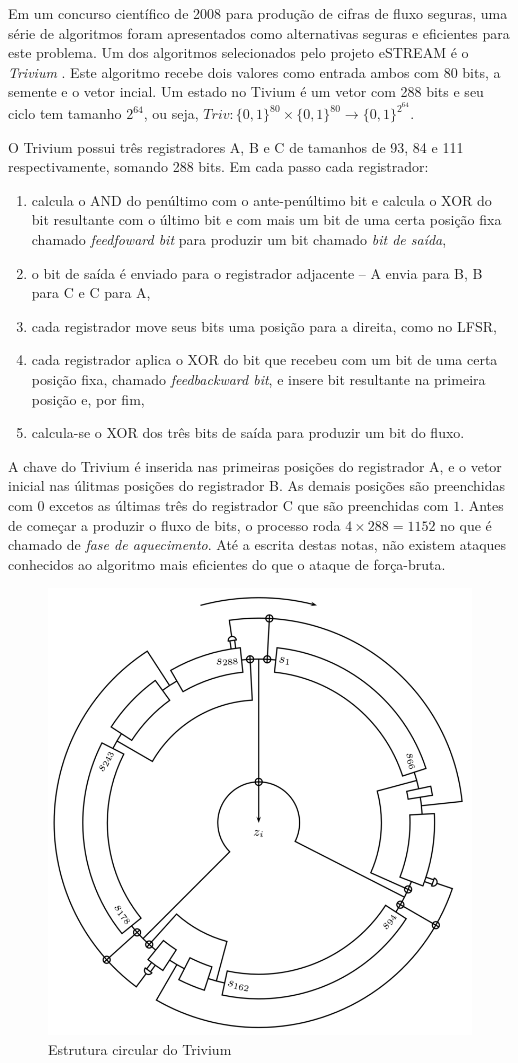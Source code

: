 Em um concurso científico de 2008 para produção de cifras de fluxo seguras, uma série de algoritmos foram apresentados como alternativas seguras e eficientes para este problema.
Um dos algoritmos selecionados pelo projeto eSTREAM é o {\em Trivium} \cite{DeCanniere06}.
Este algoritmo recebe dois valores como entrada ambos com 80 bits, a semente e o vetor incial.
Um estado no Tivium é um vetor com 288 bits e seu ciclo tem tamanho $2^{64}$, ou seja, $Triv: \{0,1\}^{80}\times \{0,1\}^{80} \to \{0,1\}^{2^{64}}$.

O Trivium possui três registradores A, B e C de tamanhos de 93, 84 e 111 respectivamente, somando 288 bits.
Em cada passo cada registrador:
\begin{enumerate}
\item calcula o AND do penúltimo com o ante-penúltimo bit e calcula o XOR do bit resultante com o último bit e com mais um bit de uma certa posição fixa chamado {\em feedfoward bit} para produzir um bit chamado {\em bit de saída},
\item o bit de saída é enviado para o registrador adjacente -- A envia para B, B para C e C para A,
\item cada registrador move seus bits uma posição para a direita, como no LFSR,
\item cada registrador aplica o XOR do bit que recebeu com um bit de uma certa posição fixa, chamado {\em feedbackward bit}, e insere bit resultante na primeira posição e, por fim,
\item calcula-se o XOR dos três bits de saída para produzir um bit do fluxo.
\end{enumerate}

A chave do Trivium é inserida nas primeiras posições do registrador A, e o vetor inicial nas úlitmas posições do registrador B.
As demais posições são preenchidas com $0$ excetos as últimas três do registrador C que são preenchidas com $1$.
Antes de começar a produzir o fluxo de bits, o processo roda $4 \times 288 = 1152$ no que é chamado de {\em fase de aquecimento}. 
Até a escrita destas notas, não existem ataques conhecidos ao algoritmo mais eficientes do que o ataque de força-bruta.


\begin{figure}
  \centering
  \includegraphics[width=.5\textwidth]{imagens/trivium.png}
  \caption{Estrutura circular do Trivium}
\end{figure}


